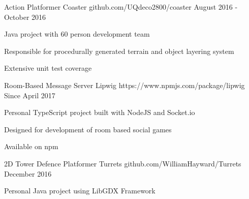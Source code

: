 


\begin{cventries}


\cventry
{Action Platformer} %
{Coaster} %
{github.com/UQdeco2800/coaster} %
{August 2016 - October 2016} %
{ %
\begin{cvitems}
\item Java project with 60 person development team
\item Responsible for procedurally generated terrain and object layering system
\item Extensive unit test coverage
\end{cvitems}
}


\cventry
{Room-Based Message Server} %
{Lipwig} %
{https://www.npmjs.com/package/lipwig} %
{Since April 2017} %
{ %
\begin{cvitems}
\item Personal TypeScript project built with NodeJS and Socket.io
\item Designed for development of room based social games
\item Available on npm
\end{cvitems}
}


\cventry
{2D Tower Defence Platformer} %
{Turrets} %
{github.com/WilliamHayward/Turrets} %
{December 2016} %
{ %
\begin{cvitems}
\item Personal Java project using LibGDX Framework
\end{cvitems}
}


\end{cventries}
